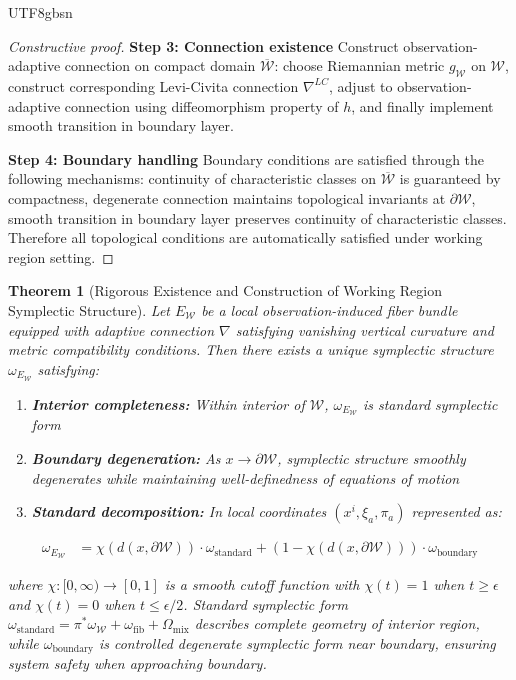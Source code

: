 \documentclass[a4paper,12pt]{extarticle}
\newtheorem{theorem}{Theorem}
\theoremstyle{definition}
\begin{document}
\begin{CJK}{UTF8}{gbsn}
\begin{proof}[Constructive proof]
\textbf{Step 3: Connection existence}
Construct observation-adaptive connection on compact domain $\overline{\mathcal{W}}$: choose Riemannian metric $g_{\mathcal{W}}$ on $\mathcal{W}$, construct corresponding Levi-Civita connection $\nabla^{LC}$, adjust to observation-adaptive connection using diffeomorphism property of $h$, and finally implement smooth transition in boundary layer.

\textbf{Step 4: Boundary handling}
Boundary conditions are satisfied through the following mechanisms: continuity of characteristic classes on $\overline{\mathcal{W}}$ is guaranteed by compactness, degenerate connection maintains topological invariants at $\partial \mathcal{W}$, smooth transition in boundary layer preserves continuity of characteristic classes. Therefore all topological conditions are automatically satisfied under working region setting.
\end{proof}

\begin{theorem}[Rigorous Existence and Construction of Working Region Symplectic Structure]
Let $E_{\mathcal{W}}$ be a local observation-induced fiber bundle equipped with adaptive connection $\nabla$ satisfying vanishing vertical curvature and metric compatibility conditions. Then there exists a unique symplectic structure $\omega_{E_{\mathcal{W}}}$ satisfying:
\begin{enumerate}
\item \textbf{Interior completeness:} Within interior of $\mathcal{W}$, $\omega_{E_{\mathcal{W}}}$ is standard symplectic form
\item \textbf{Boundary degeneration:} As $x \to \partial \mathcal{W}$, symplectic structure smoothly degenerates while maintaining well-definedness of equations of motion
\item \textbf{Standard decomposition:} In local coordinates $(x^i, \xi_a, \pi_a)$ represented as:
\end{enumerate}

\begin{align*}
\omega_{E_{\mathcal{W}}} &= \chi(d(x,\partial \mathcal{W})) \cdot \omega_{\text{standard}} + (1-\chi(d(x,\partial \mathcal{W}))) \cdot \omega_{\text{boundary}}
\end{align*}

where $\chi: [0,\infty) \to [0,1]$ is a smooth cutoff function with $\chi(t) = 1$ when $t \geq \epsilon$ and $\chi(t) = 0$ when $t \leq \epsilon/2$. Standard symplectic form $\omega_{\text{standard}} = \pi^*\omega_{\mathcal{W}} + \omega_{\text{fib}} + \Omega_{\text{mix}}$ describes complete geometry of interior region, while $\omega_{\text{boundary}}$ is controlled degenerate symplectic form near boundary, ensuring system safety when approaching boundary.


\end{theorem}
\end{CJK}
\end{document}
